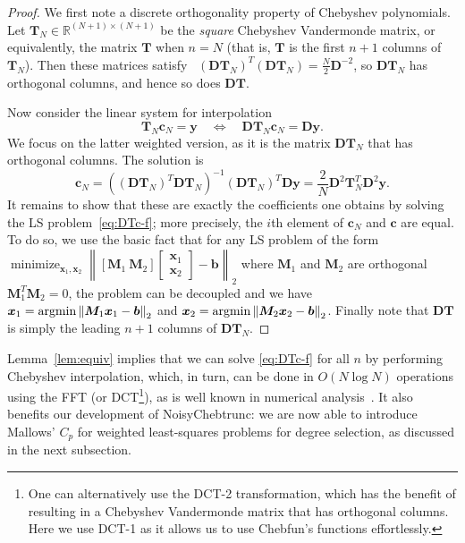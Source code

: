 \documentclass[final,onefignum,onetabnum]{siamart220329}
\def\mainalg{NoisyChebtrunc}
\DeclareMathOperator*{\minimize}{minimize}
\newcommand{\argmin}{\mathop{\rm argmin}\limits}
\newcommand{\vct}[1]{\bm{#1}}
\newcommand{\mtx}[1]{\bm{#1}}
\begin{document}
\begin{proof}  
	We first note a discrete orthogonality property of Chebyshev polynomials. 
	Let $\mtx{T}_N\in\mathbb{R}^{(N+1)\times (N+1)}$ be the \emph{square}  Chebyshev Vandermonde matrix, or equivalently, the matrix $\mtx{T}$ when $n=N$ (that is, $\mtx{T}$ is the first $n+1$ columns of $\mtx{T}_N$). Then these matrices satisfy~\cite[\S~4.6]{mason2010chebyshev} 
	$(\mtx{DT}_N)^T(\mtx{DT}_N)=\frac{N}{2}\mtx{D}^{-2}$, so $\mtx{DT}_N$ has orthogonal columns, and hence so does $\mtx{DT}$. 
	
	Now consider the linear system for interpolation
	\begin{equation}
		\label{eq:interp}
		\mtx{T}_N\vct{c}_N=\vct{y} \quad \Leftrightarrow \quad 
		\mtx{DT}_N\vct{c}_N=\vct{Dy}. 
	\end{equation}
	We focus on the latter weighted version, as it is the matrix $\mtx{DT}_N$ that has orthogonal columns. The solution is 
	\begin{equation}  \label{eq:cN}
		\vct{c}_N=
		((\mtx{DT}_N)^T\mtx{DT}_N)^{-1}(\mtx{DT}_N)^T\mtx{Dy}
		=\frac{2}{N}\mtx{D}^2\mtx{T}_N^T\!\mtx{D}^2\vct{y}.   
	\end{equation}
	\[
	\]
	It remains to show that these are exactly the coefficients one obtains by solving the LS problem~\eqref{eq:DTc-f}; more precisely, the $i$th element of $\vct{c}_N$ and $\vct{c}$ are equal. 
	To do so, we use the basic fact that for any LS problem of the form $\minimize_{\vct{x}_1,\vct{x}_2}\left\|[\mtx{M}_1\ \mtx{M}_2]
	\begin{bmatrix}
		\vct{x}_1\\\vct{x}_2\end{bmatrix}-\vct{b}\right\|_2$
	where $\mtx{M}_1$ and $\mtx{M}_2$ are orthogonal 
	$\mtx{M}_1^T\mtx{M}_2=0$, the problem can be decoupled and we have $\vct{x}_1 = \argmin\left\|\mtx{M}_1\vct{x}_1-\vct{b}\right\|_2$ and 
	$\vct{x}_2 = \argmin\left\|\mtx{M}_2\vct{x}_2-\vct{b}\right\|_2$. Finally note that $\mtx{DT}$ is simply the leading $n+1$ columns of $\mtx{DT}_N$. 
\end{proof}



Lemma~\ref{lem:equiv} implies that we can solve \eqref{eq:DTc-f} for all $n$ by performing Chebyshev interpolation, which, in turn, can be done in $O(N\log N)$ operations using the FFT (or DCT\footnote{One can alternatively use the DCT-2 transformation, which has the benefit of resulting in a Chebyshev Vandermonde matrix that has orthogonal columns. Here we use DCT-1 as it allows us to use Chebfun's functions effortlessly.}), as is well known in numerical analysis~\cite{strang1999discrete,trefethen2000spectral}. 
It also benefits our development of \mainalg: we are now able to introduce Mallows' $C_p$ for weighted least-squares problems for degree selection, as discussed in the next subsection. 
\end{document}
